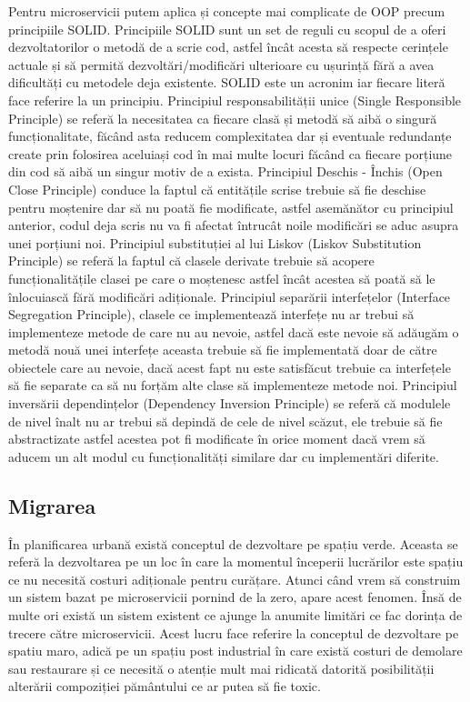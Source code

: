 Pentru microservicii putem aplica și concepte mai complicate de OOP precum principiile SOLID.
Principiile SOLID sunt un set de reguli cu scopul de a oferi dezvoltatorilor o metodă de a
scrie cod, astfel încât acesta să respecte cerințele actuale și să permită dezvoltări/modificări
ulterioare cu ușurință fără a avea dificultăți cu metodele deja existente. SOLID este un acronim
iar fiecare literă face referire la un principiu. Principiul responsabilității unice (Single Responsible
Principle) se referă la necesitatea ca fiecare clasă și metodă să aibă o singură funcționalitate,
făcând asta reducem complexitatea dar și eventuale redundanțe create prin folosirea aceluiași
cod în mai multe locuri făcând ca fiecare porțiune din cod să aibă un singur motiv de a exista.
Principiul Deschis - Închis (Open Close Principle) conduce la faptul că entitățile scrise trebuie să
fie deschise pentru moștenire dar să nu poată fie modificate, astfel asemănător cu principiul
anterior, codul deja scris nu va fi afectat întrucât noile modificări se aduc asupra unei porțiuni
noi. Principiul substituției al lui Liskov (Liskov Substitution Principle) se referă la faptul că clasele
derivate trebuie să acopere funcționalitățile clasei pe care o moștenesc astfel încât acestea să
poată să le înlocuiască fără modificări adiționale. Principiul separării interfețelor (Interface
Segregation Principle), clasele ce implementează interfețe nu ar trebui să implementeze metode
de care nu au nevoie, astfel dacă este nevoie să adăugăm o metodă nouă unei interfețe aceasta
trebuie să fie implementată doar de către obiectele care au nevoie, dacă acest fapt nu este
satisfăcut trebuie ca interfețele să fie separate ca să nu forțăm alte clase să implementeze
metode noi. Principiul inversării dependințelor (Dependency Inversion Principle) se referă că
modulele de nivel înalt nu ar trebui să depindă de cele de nivel scăzut, ele trebuie să fie
abstractizate astfel acestea pot fi modificate în orice moment dacă vrem să aducem un alt modul
cu funcționalități similare dar cu implementări diferite.\cite{temasolid}

\subsection{Migrarea}

În planificarea urbană există conceptul de dezvoltare pe spațiu verde. Aceasta se referă 
la dezvoltarea pe un loc în care la momentul începerii lucrărilor este spațiu ce nu necesită
costuri adiționale pentru curățare. Atunci când vrem să construim un sistem bazat pe microservicii
pornind de la zero, apare acest fenomen. Însă de multe ori există un sistem existent ce ajunge
la anumite limitări ce fac dorința de trecere către microservicii. Acest lucru face referire la 
conceptul de dezvoltare pe spatiu maro, adică pe un spațiu post industrial în care există costuri de 
demolare sau restaurare și ce necesită o atenție mult mai ridicată datorită posibilității alterării
compoziției pământului ce ar putea să fie toxic.

